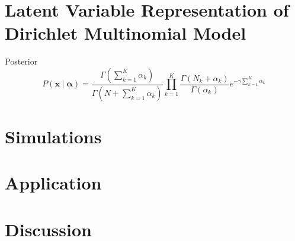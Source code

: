 \documentclass[11pt]{article}%
\begin{document}
\section{Latent Variable Representation of Dirichlet Multinomial Model}
Posterior
\begin{equation}
P(\mathbf{x} \mid \boldsymbol{\alpha}) = \frac{\Gamma(\sum_{k=1}^K \alpha_k)}{\Gamma(N + \sum_{k=1}^K \alpha_k)} \prod_{k=1}^K \frac{\Gamma(N_k + \alpha_k)}{\Gamma(\alpha_k)} e^{-\gamma \sum_{k=1}^K \alpha_k}
\end{equation}



\section{Simulations}

\section{Application}

\section{Discussion}

\newpage
 
\end{document}
